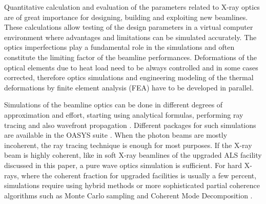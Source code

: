 \documentclass{iucr}              %
\begin{document}
Quantitative calculation and evaluation of the parameters related to X-ray optics are of great importance for designing, building and exploiting new beamlines. These calculations allow testing of the design parameters in a virtual computer environment where advantages and limitations can be simulated accurately. The optics imperfections play a fundamental role in the simulations and often constitute the limiting factor of the beamline performances. Deformations of the optical elements due to heat load need to be always controlled and in some cases corrected, therefore optics simulations and engineering modeling of the thermal deformations by finite element analysis (FEA) have to be developed in parallel. 

Simulations of the beamline optics can be done in different degrees of approximation and effort, starting using analytical formulas, performing ray tracing and also wavefront propagation \cite{hyerarchical}. Different packages for such simulations are available in the OASYS suite \cite{codeOASYS}. When the photon beams are mostly incoherent, the ray tracing technique is enough for most purposes. If the X-ray beam is highly coherent, like in soft X-ray beamlines of the upgraded ALS facility discussed in this paper, a pure wave optics simulation is sufficient. For 
hard X-rays, where the coherent fraction for upgraded facilities is usually a few percent, simulations require using hybrid methods \cite{hybrid} or more sophisticated partial coherence algorithms such as Monte Carlo sampling \cite{Chubar2011b} and Coherent Mode Decomposition \cite{codeCOMSYL}. 
\end{document}
